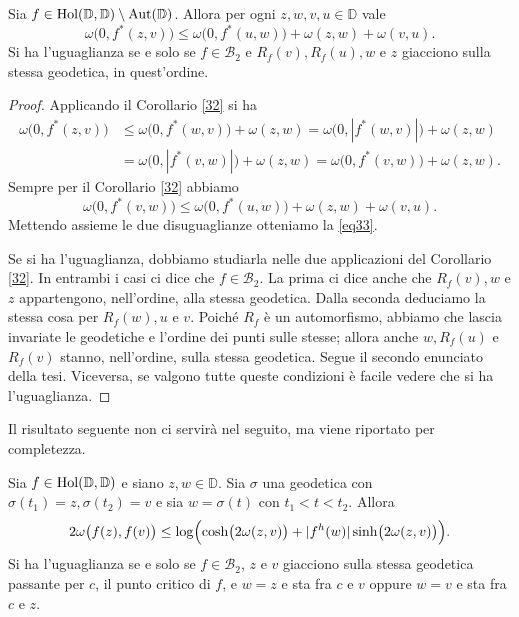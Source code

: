 \begin{cor} \label{33}
  Sia $f \in \text{\normalfont{Hol}}(\mathbb{D},\mathbb{D})\setminus\text{\normalfont{Aut}}(\mathbb{D})$. Allora per ogni $z, w, v, u \in \mathbb{D}$ vale
  \begin{equation} \label{eq33}
    \omega\bigl(0, f^*(z,v)\bigr) \le \omega\bigl(0, f^*(u,w)\bigr)+\omega(z,w)+\omega(v,u).
  \end{equation}
  Si ha l'uguaglianza se e solo se $f \in \mathcal{B}_2$ e $R_f(v), R_f(u), w$ e $z$ giacciono sulla stessa geodetica, in quest'ordine.
\end{cor}
\begin{proof}
  Applicando il Corollario \ref{32} si ha
  \begin{align*}
    \omega\bigl(0,f^*(z,v)\bigr) & \le \omega\bigl(0,f^*(w,v)\bigr)+\omega(z,w) =\omega\bigl(0,|f^*(w,v)|\bigr)+\omega(z,w) \\
    & =\omega\bigl(0,|f^*(v,w)|\bigr)+\omega(z,w)=\omega\bigl(0,f^*(v,w)\bigr)+\omega(z,w).
  \end{align*}
  Sempre per il Corollario \ref{32} abbiamo
  $$\omega\bigl(0,f^*(v,w)\bigr) \le \omega\bigl(0,f^*(u,w)\bigr)+\omega(z,w)+\omega(v,u).$$
  Mettendo assieme le due disuguaglianze otteniamo la \eqref{eq33}.

  Se si ha l'uguaglianza, dobbiamo studiarla nelle due applicazioni del Corollario \ref{32}. In entrambi i casi ci dice che $f \in \mathcal{B}_2$. La prima ci dice anche che $R_f(v), w$ e $z$ appartengono, nell'ordine, alla stessa geodetica. Dalla seconda deduciamo la stessa cosa per $R_f(w), u$ e $v$. Poiché $R_f$ è un automorfismo, abbiamo che lascia invariate le geodetiche e l'ordine dei punti sulle stesse; allora anche $w, R_f(u)$ e $R_f(v)$ stanno, nell'ordine, sulla stessa geodetica. Segue il secondo enunciato della tesi. Viceversa, se valgono tutte queste condizioni è facile vedere che si ha l'uguaglianza.
\end{proof}

Il risultato seguente non ci servirà nel seguito, ma viene riportato per completezza.

\begin{cor} \label{35}
  Sia $f \in \normalfont{\text{Hol}}(\mathbb{D},\mathbb{D})$ e siano $z, w \in \mathbb{D}$. Sia $\sigma$ una geodetica con $\sigma(t_1)=z, \sigma(t_2)=v$ e sia $w=\sigma(t)$ con $t_1<t<t_2$. Allora
  \begin{equation} \label{geod}
    2\omega\bigl(f(z),f(v)\bigr) \le \log\Bigl(\cosh\bigl(2\omega(z,v)\bigr)+|f^h(w)|\sinh\bigl(2\omega(z,v)\bigr)\Bigr).
  \end{equation}
  Si ha l'uguaglianza se e solo se $f \in \mathcal{B}_2$, $z$ e $v$ giacciono sulla stessa geodetica passante per $c$, il punto critico di $f$, e $w=z$ e sta fra $c$ e $v$ oppure $w=v$ e sta fra $c$ e $z$.
\end{cor}

